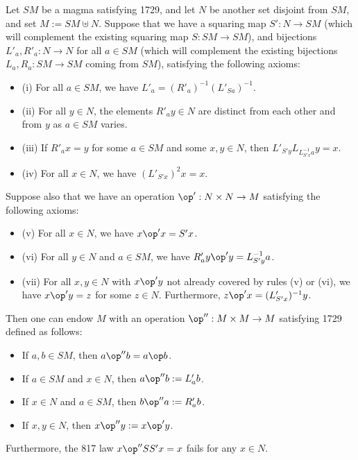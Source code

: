 \begin{theorem}\label{mag}  Let $SM$ be a magma satisfying 1729, and let $N$ be another set disjoint from $SM$, and set $M := SM \uplus N$.  Suppose that we have a squaring map $S': N \to SM$ (which will complement the existing squaring map $S: SM \to SM$), and bijections $L'_a, R'_a: N \to N$ for all $a \in SM$ (which will complement the existing bijections $L_a, R_a: SM \to SM$ coming from $SM$), satisfying the following axioms:
  \begin{itemize}
  \item (i) For all $a \in SM$, we have $L'_a = (R'_a)^{-1} (L'_{Sa})^{-1}$.
  \item (ii) For all $y \in N$, the elements $R'_a y \in N$ are distinct from each other and from $y$ as $a \in SM$ varies.
  \item (iii)  If $R'_a x = y$ for some $a \in SM$ and some $x,y \in N$, then $L'_{S'y} L_{L_{S'x}^{-1} a} y = x$.
  \item (iv)  For all $x \in N$, we have $(L'_{S'x})^2 x = x$.
  \end{itemize}
Suppose also that we have an operation $\op': N \times N \to M$ satisfying the following axioms:
\begin{itemize}
  \item (v)  For all $x \in N$, we have $x \op' x = S'x$.
  \item (vi)  For all $y \in N$ and $a \in SM$, we have $R'_a y \op' y = L_{S'y}^{-1} a$.
  \item (vii)  For all $x,y \in N$ with $x \op' y$ not already covered by rules (v) or (vi), we have $x \op' y = z$ for some $z \in N$.  Furthermore, $z \op' x = (L'_{S'x})^{-1} y$.
\end{itemize}
Then one can endow $M$ with an operation $\op'': M \times M \to M$ satisfying 1729 defined as follows:
\begin{itemize}
\item  If $a,b \in SM$, then $a \op'' b = a \op b$.
\item  If $a \in SM$ and $x \in N$, then $a \op'' b := L'_a b$.
\item  If $x \in N$ and $a \in SM$, then $b \op'' a := R'_a b$.
\item  If $x,y \in N$, then $x \op'' y := x \op' y$.
\end{itemize}
Furthermore, the 817 law $x \op'' SS' x = x$ fails for any $x \in N$.
\end{theorem}

